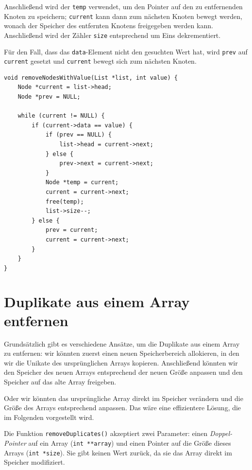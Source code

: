Anschließend wird der \texttt{temp} verwendet, um den Pointer auf den zu
entfernenden Knoten zu speichern; \texttt{current} kann dann zum nächsten
Knoten bewegt werden, wonach der Speicher des entfernten Knotens freigegeben
werden kann. Anschließend wird der Zähler \texttt{size} entsprechend um
Eins dekrementiert.

Für den Fall, dass das \texttt{data}-Element nicht den gesuchten Wert
hat, wird \texttt{prev} auf \texttt{current} gesetzt und
\texttt{current} bewegt sich zum nächsten Knoten.

\begin{verbatim}
void removeNodesWithValue(List *list, int value) {
    Node *current = list->head;
    Node *prev = NULL;

    while (current != NULL) {
        if (current->data == value) {
            if (prev == NULL) {
                list->head = current->next;
            } else {
                prev->next = current->next;
            }
            Node *temp = current;
            current = current->next;
            free(temp);
            list->size--;
        } else {
            prev = current;
            current = current->next;
        }
    }
}
\end{verbatim}





\chapter{Duplikate aus einem Array entfernen}

Grundsätzlich gibt es verschiedene Ansätze, um die Duplikate aus einem Array zu
entfernen: wir könnten zuerst einen neuen Speicherbereich allokieren, in den wir
die Unikate des ursprünglichen Arrays kopieren. Anschließend könnten wir den
Speicher des neuen Arrays entsprechend der neuen Größe anpassen und den Speicher
auf das alte Array freigeben.

Oder wir könnten das ursprüngliche Array direkt im Speicher verändern und die
Größe des Arrays entsprechend anpassen. Das wäre eine effizientere Lösung, die
im Folgenden vorgestellt wird.

Die Funktion \texttt{removeDuplicates()} akzeptiert zwei Parameter: einen
\textit{Doppel-Pointer} auf ein Array (\texttt{int **array}) und einen
Pointer auf die Größe dieses Arrays (\texttt{int *size}). Sie gibt keinen
Wert zurück, da sie das Array direkt im Speicher modifiziert.

